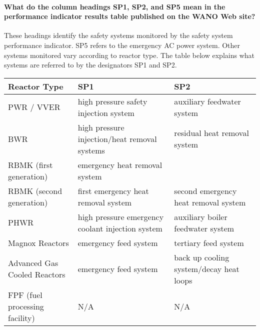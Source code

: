 \paragraph{What do the column headings SP1, SP2, and SP5 mean in the
  performance indicator results table published on the WANO Web site?}

These headings identify the safety systems monitored by the safety system performance indicator. SP5 refers to the emergency AC power system. Other systems monitored vary according to reactor type. The table below explains what systems are referred to by the designators SP1 and SP2.

\begin{tabular}{p{4cm}p{5cm}p{5cm}}
Reactor Type & SP1 & SP2 \\
\hline
PWR / VVER & high pressure safety injection system & auxiliary
                                                     feedwater system \\
BWR & high pressure injection/heat removal systems & residual heat
                                                     removal system \\
RBMK (first generation) & emergency heat removal system &\\
RBMK (second generation) & first emergency heat removal system &
                                                                 second emergency heat removal system \\
PHWR & high pressure emergency coolant injection system & auxiliary
                                                          boiler
                                                          feedwater
                                                          system \\
Magnox Reactors & emergency feed system & tertiary feed system \\
Advanced Gas Cooled Reactors & emergency feed system &back up cooling
                                                       system/decay
                                                       heat loops \\
FPF (fuel processing facility) & N/A & N/A \\
\end{tabular}

